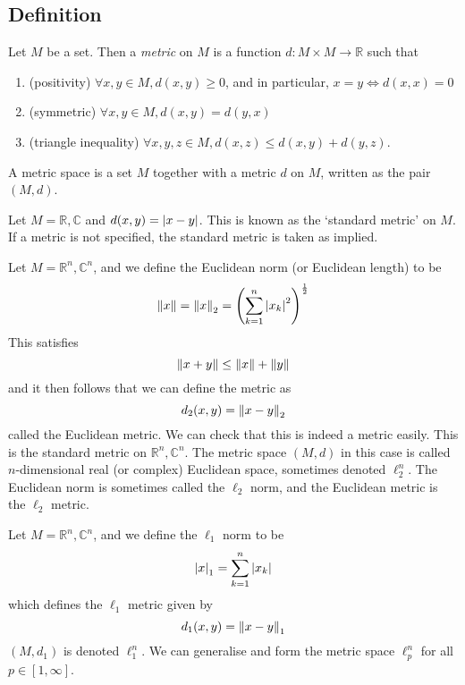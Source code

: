 \subsection{Definition}
\begin{definition}
	Let \( M \) be a set.
	Then a \textit{metric} on \( M \) is a function \( d \colon M \times M \to \mathbb R \) such that
	\begin{enumerate}
		\item (positivity) \( \forall x,y \in M, d(x,y) \geq 0 \), and in particular, \( x = y \iff d(x,x) = 0 \)
		\item (symmetric) \( \forall x,y \in M, d(x,y) = d(y,x) \)
		\item (triangle inequality) \( \forall x,y,z \in M, d(x,z) \leq d(x,y) + d(y,z) \).
	\end{enumerate}
	A metric space is a set \( M \) together with a metric \( d \) on \( M \), written as the pair \( (M, d) \).
\end{definition}
\begin{example}
	Let \( M = \mathbb R, \mathbb C \) and \( d(x,y) = \abs{x-y} \).
	This is known as the `standard metric' on \( M \).
	If a metric is not specified, the standard metric is taken as implied.
\end{example}
\begin{example}
	Let \( M = \mathbb R^n, \mathbb C^n \), and we define the Euclidean norm (or Euclidean length) to be
	\[
		\norm{x} = \norm{x}_2 = \qty(\sum_{k=1}^n \abs{x_k}^2)^{\frac{1}{2}}
	\]
	This satisfies
	\[
		\norm{x+y} \leq \norm{x} + \norm{y}
	\]
	and it then follows that we can define the metric as
	\[
		d_2(x,y) = \norm{x-y}_2
	\]
	called the Euclidean metric.
	We can check that this is indeed a metric easily.
	This is the standard metric on \( \mathbb R^n, \mathbb C^n \).
	The metric space \( (M, d) \) in this case is called \( n \)-dimensional real (or complex) Euclidean space, sometimes denoted \( \ell_2^n \).
	The Euclidean norm is sometimes called the \( \ell_2 \) norm, and the Euclidean metric is the \( \ell_2 \) metric.
\end{example}
\begin{example}
	Let \( M = \mathbb R^n, \mathbb C^n \), and we define the \( \ell_1 \) norm to be
	\[
		\abs{x}_1 = \sum_{k=1}^n \abs{x_k}
	\]
	which defines the \( \ell_1 \) metric given by
	\[
		d_1(x,y) = \norm{x-y}_1
	\]
	\( (M, d_1) \) is denoted \( \ell_1^n \).
	We can generalise and form the metric space \( \ell_p^n \) for all \( p \in [1, \infty] \).
\end{example}
